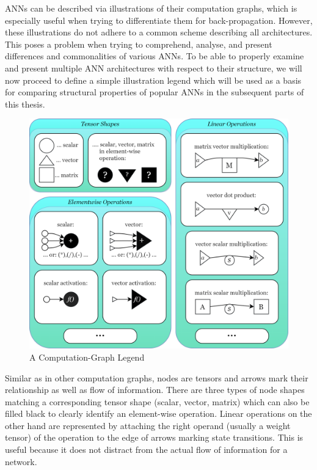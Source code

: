 ANNs can be described via illustrations of their computation graphs, which
is especially useful when trying to differentiate them for back-propagation.
\cite[subsection 6.5.1]{Goodfellow-et-al-2016}
However, these illustrations do not adhere to a common scheme describing all architectures. 
This poses a problem when trying to comprehend, analyse, and present differences and commonalities of various \acp{ANN}.
To be able to properly examine and present multiple ANN architectures with respect to their structure, we will now proceed to define a simple illustration legend which will be used as a basis for comparing structural properties of popular \acp{ANN} in the subsequent parts of this thesis.

\begin{figure}[h]
  \centering 
    \includegraphics[width=\textwidth]{PICs/computation-graph-legend.png}
    \caption{A Computation-Graph Legend} 
\end{figure}


Similar as in other computation graphs, nodes are tensors and arrows mark their relationship as well as flow of information. There are three types of node shapes matching a corresponding tensor shape (scalar, vector, matrix) which can also be filled black to clearly identify an element-wise operation.
Linear operations on the other hand are represented by attaching the right operand (usually a weight tensor) of the operation to the edge of arrows marking state transitions. This is useful because it does not distract from the actual flow of information for a network.
 


